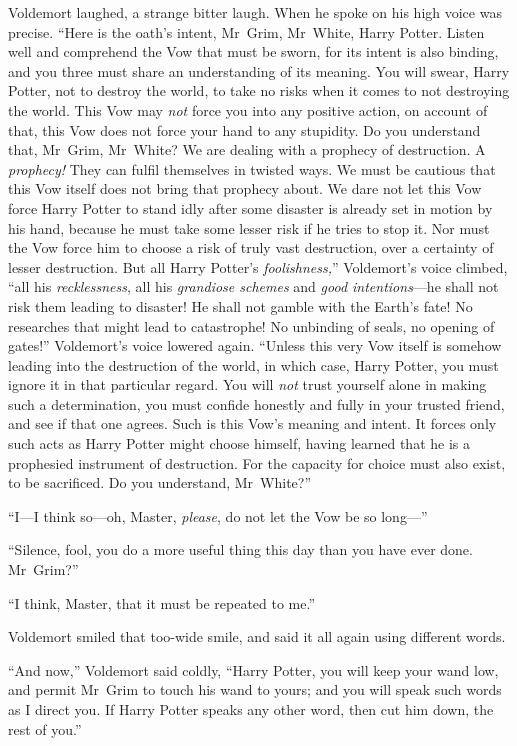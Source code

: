 Voldemort laughed, a strange bitter laugh. When he spoke on his high voice was precise. “Here is the oath’s intent, Mr~Grim, Mr~White, Harry Potter. Listen well and comprehend the Vow that must be sworn, for its intent is also binding, and you three must share an understanding of its meaning. You will swear, Harry Potter, not to destroy the world, to take no risks when it comes to not destroying the world. This Vow may \emph{not} force you into any positive action, on account of that, this Vow does not force your hand to any stupidity. Do you understand that, Mr~Grim, Mr~White? We are dealing with a prophecy of destruction. A \emph{prophecy!} They can fulfil themselves in twisted ways. We must be cautious that this Vow itself does not bring that prophecy about. We dare not let this Vow force Harry Potter to stand idly after some disaster is already set in motion by his hand, because he must take some lesser risk if he tries to stop it. Nor must the Vow force him to choose a risk of truly vast destruction, over a certainty of lesser destruction. But all Harry Potter’s \emph{foolishness,}” Voldemort’s voice climbed, “all his \emph{recklessness}, all his \emph{grandiose schemes} and \emph{good intentions}—he shall not risk them leading to disaster! He shall not gamble with the Earth’s fate! No researches that might lead to catastrophe! No unbinding of seals, no opening of gates!” Voldemort’s voice lowered again. “Unless this very Vow itself is somehow leading into the destruction of the world, in which case, Harry Potter, you must ignore it in that particular regard. You will \emph{not} trust yourself alone in making such a determination, you must confide honestly and fully in your trusted friend, and see if that one agrees. Such is this Vow’s meaning and intent. It forces only such acts as Harry Potter might choose himself, having learned that he is a prophesied instrument of destruction. For the capacity for choice must also exist, to be sacrificed. Do you understand, Mr~White?”

“I—I think so—oh, Master, \emph{please}, do not let the Vow be so long—”

“Silence, fool, you do a more useful thing this day than you have ever done. Mr~Grim?”

“I think, Master, that it must be repeated to me.”

Voldemort smiled that too-wide smile, and said it all again using different words.

“And now,” Voldemort said coldly, “Harry Potter, you will keep your wand low, and permit Mr~Grim to touch his wand to yours; and you will speak such words as I direct you. If Harry Potter speaks any other word, then cut him down, the rest of you.”

